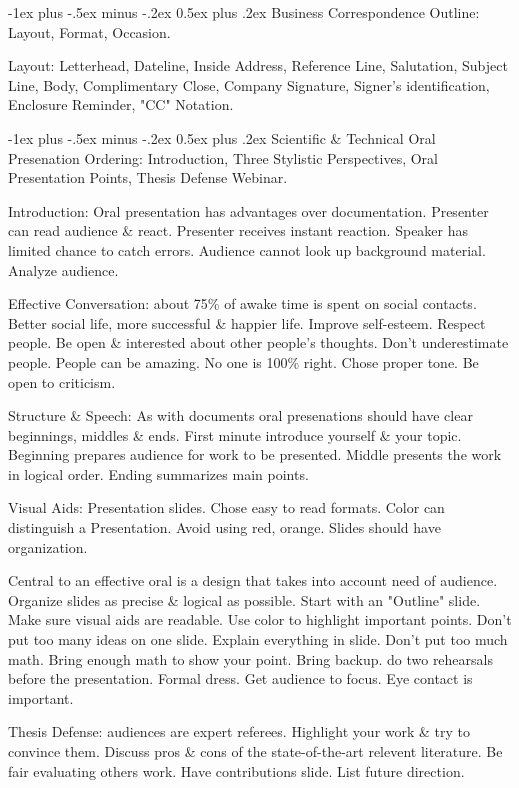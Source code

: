 \documentclass[10pt,landscape]{article}
\makeatletter
\renewcommand{\section}{\@startsection{section}{1}{0mm}%
                                {-1ex plus -.5ex minus -.2ex}%
                                {0.5ex plus .2ex}%
                                {\normalfont\large\bfseries}}
\makeatother
\begin{document}
\begin{multicols*}{3}
\section{Business Correspondence}
Outline: Layout, Format, Occasion.

Layout: Letterhead, Dateline, Inside Address, Reference Line, Salutation, Subject Line, 
Body, Complimentary Close, Company Signature, Signer's identification, Enclosure Reminder, "CC" Notation.

\section{Scientific \& Technical Oral Presenation}
Ordering: Introduction, Three Stylistic Perspectives, Oral Presentation Points, Thesis Defense Webinar.

Introduction: Oral presentation has advantages over documentation. Presenter
can read audience \& react. Presenter receives instant reaction.
Speaker has limited chance to catch errors. Audience cannot look up background material.
Analyze audience.

Effective Conversation: about 75\% of awake time is spent on social contacts.
Better social life, more successful \& happier life.
Improve self-esteem. Respect people. Be open \& interested about other people's thoughts.
Don't underestimate people. People can be amazing. No one is 100\% right.
Chose proper tone. Be open to criticism.

Structure \& Speech:
As with documents oral presenations should have clear beginnings, middles \& ends.
First minute introduce yourself \& your topic.
Beginning prepares audience for work to be presented.
Middle presents the work in logical order.
Ending summarizes main points.

Visual Aids: Presentation slides. Chose easy to read formats. Color can distinguish a Presentation.
Avoid using red, orange. Slides should have organization.

Central to an effective oral is a design that takes into account need of audience.
Organize slides as precise \& logical as possible.
Start with an "Outline" slide.
Make sure visual aids are readable.
Use color to highlight important points.
Don't put too many ideas on one slide.
Explain everything in slide.
Don't put too much math.
Bring enough math to show your point.
Bring backup.
do two rehearsals before the presentation.
Formal dress.
Get audience to focus. Eye contact is important.

Thesis Defense: audiences are expert referees.
Highlight your work \& try to convince them. Discuss pros \& cons of the state-of-the-art relevent 
literature. Be fair evaluating others work.
Have contributions slide.
List future direction.


\end{multicols*}
\end{document}
